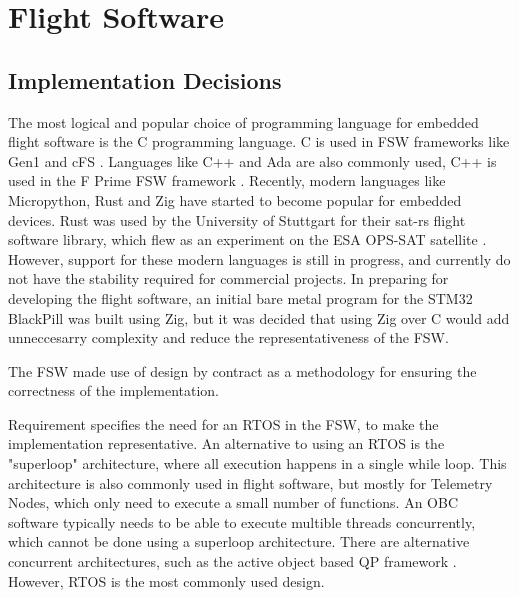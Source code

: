 \documentclass[../report.tex]{subfiles}
\begin{document}



\section{Flight Software}

\subsection{Implementation Decisions}

The most logical and popular choice of programming language for embedded flight
software is the C programming language. C is used in FSW frameworks like Gen1
and cFS \citep{Bal_FSDK, Nasa_cFS}. Languages like C++ and Ada are also
commonly used, C++ is used in the F Prime FSW framework \citep{Nasa_fprime}.
Recently, modern languages like Micropython, Rust and Zig have started to
become popular for embedded devices. Rust was used by the University of
Stuttgart for their sat-rs flight software library, which flew as an experiment
on the ESA OPS-SAT satellite \citep{satrs, opsat}. However, support for these
modern languages is still in progress, and currently do not have the stability
required for commercial projects. In preparing for developing the flight
software, an initial bare metal program for the STM32 BlackPill was built using
Zig, but it was decided that using Zig over C would add unneccesarry complexity
and reduce the representativeness of the FSW.

The FSW made use of design by contract as a methodology for ensuring the
correctness of the implementation. %

Requirement  specifies the need for an RTOS in the FSW, to make
the implementation representative. An alternative to using an RTOS is the
"superloop" architecture, where all execution happens in a single while loop.
This architecture is also commonly used in flight software, but mostly for
Telemetry Nodes, which only need to execute a small number of functions. An OBC
software typically needs to be able to execute multible threads concurrently,
which cannot be done using a superloop architecture. There are alternative
concurrent architectures, such as the active object based QP framework
\citep{QP}. However, RTOS is the most commonly used design.
\end{document}
